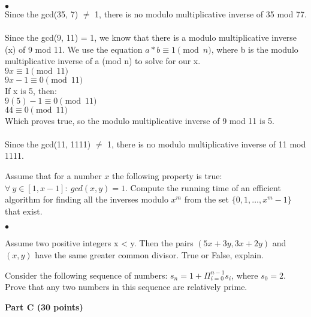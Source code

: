 \documentclass{article}
\newenvironment{myitem}{\begin{list}{$\bullet$}
{\setlength{\itemsep}{-0pt}
\setlength{\topsep}{0pt}
\setlength{\labelwidth}{0pt}
\setlength{\leftmargin}{10pt}
\setlength{\parsep}{-0pt}
\setlength{\itemsep}{0pt}
\setlength{\partopsep}{0pt}}}%
{\end{list}}
\begin{document}
\begin{myitem}
 \\
Since the gcd(35, 7) $\neq$ 1, there is no modulo multiplicative inverse of 35 mod 77.\\

 \\
Since the gcd(9, 11) = 1, we know that there is a modulo multiplicative inverse
(x) of 9 mod 11. We use the equation $a*b \equiv 1 \pmod{n}$, where b is the
modulo multiplicative inverse of a (mod n) to solve for our x.\\
$9x \equiv 1 \pmod{11}$\\
$9x - 1  \equiv 0 \pmod{11}$\\
If x is 5, then:\\
$9(5)-1 \equiv 0 \pmod{11}$\\
$44 \equiv 0 \pmod{11}$\\
Which proves true, so the modulo multiplicative inverse of 9 mod 11 is 5.\\

\\ 
Since the gcd(11, 1111) $\neq$ 1, there is no modulo multiplicative inverse of 11 mod 1111.\\


\item Assume that for a number $x$ the following property is true:
  $\forall\ y \in [1,x-1]:\ gcd(x,y) = 1$. Compute the running time of
  an efficient algorithm for finding all the inverses modulo $x^m$
  from the set $\{0, 1, \ldots, x^m-1\}$ that exist.\\
\end{myitem}

\begin{myitem}
\item Assume two positive integers x < y. Then the pairs
  $(5x+3y,3x+2y)$ and $(x,y)$ have the same greater common
  divisor. True or False, explain.\\

\item Consider the following sequence of numbers: $s_n = 1 +
  \Pi_{i=0}^{n-1} s_i$, where $s_0 = 2$. Prove that any two numbers in
  this sequence are relatively prime.\\
\end{myitem}

\begin{center}
{\bf Part C (30 points)}
\end{center}
\end{document}
